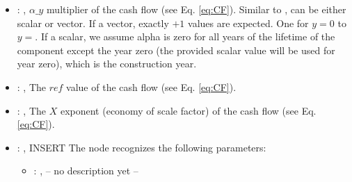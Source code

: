 \begin{itemize}
\begin{itemize}
\begin{itemize}
            \item {}: , 
              $\alpha\_{y}$ multiplier of the cash flow (see Eq. \ref{eq:CF}). Similar to
              , can be                               either scalar or vector. If a
              vector, exactly $ + 1$                               values are
              expected. One for $y=0$ to $y=$. If a scalar, we assume alpha is
              zero for all years of the lifetime                               of the component
              except the year zero (the provided scalar value will be used for year zero), which is
              the construction year.

            \item {}: , 
              The $ref$ value of the cash flow (see Eq. \ref{eq:CF}).

            \item {}: , 
              The $X$ exponent (economy of scale factor) of the cash flow (see Eq. \ref{eq:CF}).

            \item {}: , 
              INSERT
              The  node recognizes the following parameters:
                \begin{itemize}
                  \item {}: , 
                    -- no description yet --
              \end{itemize}
          \end{itemize}
      \end{itemize}


\end{itemize}
